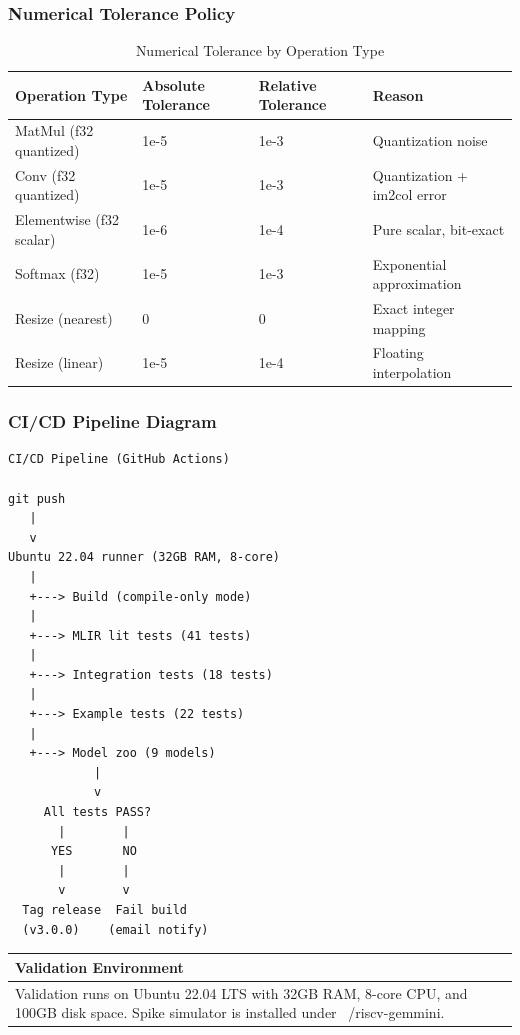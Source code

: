 \documentclass[12pt,a4paper]{article}
\newenvironment{notebox}[1][Note]{
    \begin{center}
    \begin{tabular}{|p{0.95\textwidth}|}
    \hline
    \textbf{#1} \\
    \hline
    \begin{minipage}{0.93\textwidth}
}{
    \end{minipage} \\
    \hline
    \end{tabular}
    \end{center}
}
\begin{document}
\subsubsection{Numerical Tolerance Policy}

\begin{table}[H]
\centering
\begin{tabular}{|p{}|p{}|p{}|p{}|}
\hline
\textbf{Operation Type} & \textbf{Absolute Tolerance} & \textbf{Relative Tolerance} & \textbf{Reason} \\
\hline
MatMul (f32 quantized) & 1e-5 & 1e-3 & Quantization noise \\
\hline
Conv (f32 quantized) & 1e-5 & 1e-3 & Quantization + im2col error \\
\hline
Elementwise (f32 scalar) & 1e-6 & 1e-4 & Pure scalar, bit-exact \\
\hline
Softmax (f32) & 1e-5 & 1e-3 & Exponential approximation \\
\hline
Resize (nearest) & 0 & 0 & Exact integer mapping \\
\hline
Resize (linear) & 1e-5 & 1e-4 & Floating interpolation \\
\hline
\end{tabular}
\caption{Numerical Tolerance by Operation Type}
\end{table}

\subsubsection{CI/CD Pipeline Diagram}

\begin{verbatim}
CI/CD Pipeline (GitHub Actions)

git push
   |
   v
Ubuntu 22.04 runner (32GB RAM, 8-core)
   |
   +---> Build (compile-only mode)
   |
   +---> MLIR lit tests (41 tests)
   |
   +---> Integration tests (18 tests)
   |
   +---> Example tests (22 tests)
   |
   +---> Model zoo (9 models)
            |
            v
     All tests PASS?
       |        |
      YES       NO
       |        |
       v        v
  Tag release  Fail build
  (v3.0.0)    (email notify)
\end{verbatim}

\begin{notebox}[Validation Environment]
Validation runs on Ubuntu 22.04 LTS with 32GB RAM, 8-core CPU, and 100GB disk space. Spike simulator is installed under ~/riscv-gemmini.
\end{notebox}
\end{document}
